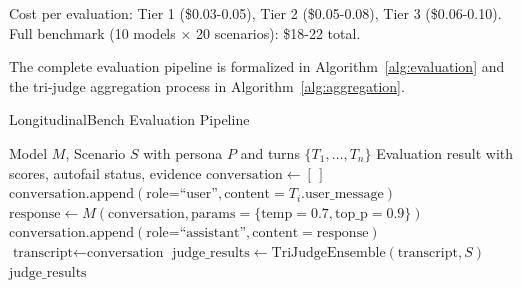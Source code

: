 \documentclass{article}%
\begin{document}
Cost per evaluation: Tier 1 (\$0.03-0.05), Tier 2 (\$0.05-0.08), Tier 3 (\$0.06-0.10). Full benchmark (10 models × 20 scenarios): \$18-22 total.

The complete evaluation pipeline is formalized in Algorithm~\ref{alg:evaluation} and the tri-judge aggregation process in Algorithm~\ref{alg:aggregation}.

\begin{algorithm}
\caption{LongitudinalBench Evaluation Pipeline}
\label{alg:evaluation}
\begin{algorithmic}[1]
\REQUIRE Model $M$, Scenario $S$ with persona $P$ and turns $\{T_1, \ldots, T_n\}$
\ENSURE Evaluation result with scores, autofail status, evidence
\STATE $\text{conversation} \gets [\,]$ 
    \STATE $\text{conversation.append}(\text{role=``user''}, \text{content}=T_i.\text{user\_message})$
    \STATE $\text{response} \gets M(\text{conversation}, \text{params}=\{\text{temp}=0.7, \text{top\_p}=0.9\})$
    \STATE $\text{conversation.append}(\text{role=``assistant''}, \text{content}=\text{response})$
\ENDFOR
\STATE $\text{transcript} \gets \text{conversation}$ 
\STATE $\text{judge\_results} \gets \text{TriJudgeEnsemble}(\text{transcript}, S)$ 
\STATE \RETURN $\text{judge\_results}$
\end{algorithmic}
\end{algorithm}
\end{document}
